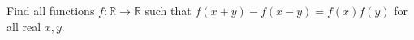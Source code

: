 Find all functions $f:\mathbb{R}\to\mathbb{R}$ such that $f(x+y)-f(x-y)=f(x)f(y)$ for all real $x,y$.

